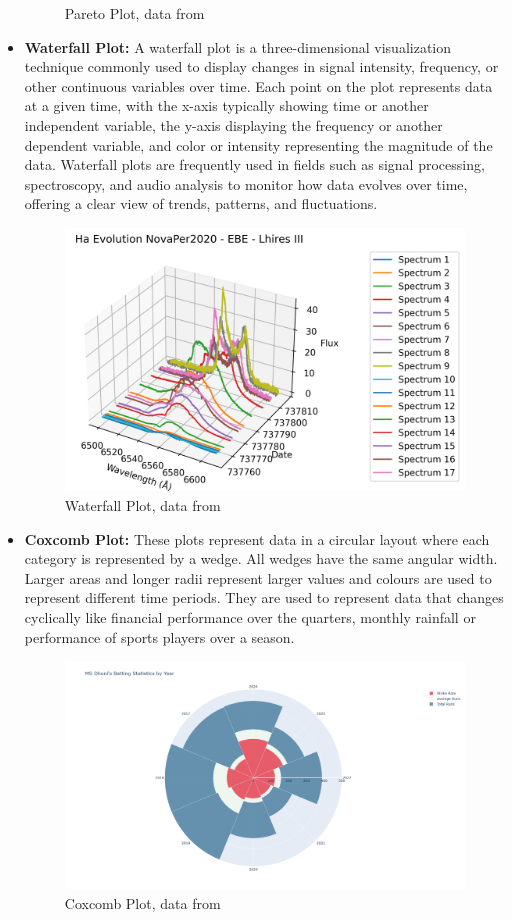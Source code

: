 \begin{itemize}
\begin{figure}[H]
		      \caption{Pareto Plot, data from \cite{SelenerConsumerComplaints}}
	      \end{figure}
	\item \textbf{Waterfall Plot:} A waterfall plot is a three-dimensional visualization technique commonly used to display changes in signal intensity, frequency, or other continuous variables over time. Each point on the plot represents data at a given time, with the x-axis typically showing time or another independent variable, the y-axis displaying the frequency or another dependent variable, and color or intensity representing the magnitude of the data. Waterfall plots are frequently used in fields such as signal processing, spectroscopy, and audio analysis to monitor how data evolves over time, offering a clear view of trends, patterns, and fluctuations.
	      \begin{figure}[H]
		      \centering
		      \includegraphics[width=0.8\linewidth]{img/waterfall.png}
		      \caption{Waterfall Plot, data from \cite{Spec3DData}}
	      \end{figure}
	\item \textbf{Coxcomb Plot:} These plots represent data in a circular layout where each category is represented by a wedge. All wedges have the same angular width. Larger areas and longer radii represent larger values and colours are used to represent different time periods. They are used to represent data that changes cyclically like financial performance over the quarters, monthly rainfall or performance of sports players over a season.
	      \begin{figure}[H]
		      \centering
		      \includegraphics[width=0.85\linewidth]{img/coxcomb.png}
		      \caption{Coxcomb Plot, data from \cite{IPLT20CSKSquad}}
	      \end{figure}


\end{itemize}
